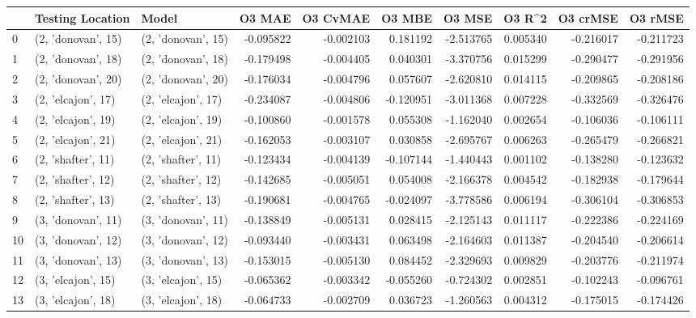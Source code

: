 \begin{tabular}{lllrrrrrrr}
\toprule
{} &    Testing Location &               Model &    O3 MAE &  O3 CvMAE &    O3 MBE &     O3 MSE &    O3 R\textasciicircum2 &  O3 crMSE &   O3 rMSE \\
\midrule
0  &  (2, 'donovan', 15) &  (2, 'donovan', 15) & -0.095822 & -0.002103 &  0.181192 &  -2.513765 &  0.005340 & -0.216017 & -0.211723 \\
1  &  (2, 'donovan', 18) &  (2, 'donovan', 18) & -0.179498 & -0.004405 &  0.040301 &  -3.370756 &  0.015299 & -0.290477 & -0.291956 \\
2  &  (2, 'donovan', 20) &  (2, 'donovan', 20) & -0.176034 & -0.004796 &  0.057607 &  -2.620810 &  0.014115 & -0.209865 & -0.208186 \\
3  &  (2, 'elcajon', 17) &  (2, 'elcajon', 17) & -0.234087 & -0.004806 & -0.120951 &  -3.011368 &  0.007228 & -0.332569 & -0.326476 \\
4  &  (2, 'elcajon', 19) &  (2, 'elcajon', 19) & -0.100860 & -0.001578 &  0.055308 &  -1.162040 &  0.002654 & -0.106036 & -0.106111 \\
5  &  (2, 'elcajon', 21) &  (2, 'elcajon', 21) & -0.162053 & -0.003107 &  0.030858 &  -2.695767 &  0.006263 & -0.265479 & -0.266821 \\
6  &  (2, 'shafter', 11) &  (2, 'shafter', 11) & -0.123434 & -0.004139 & -0.107144 &  -1.440443 &  0.001102 & -0.138280 & -0.123632 \\
7  &  (2, 'shafter', 12) &  (2, 'shafter', 12) & -0.142685 & -0.005051 &  0.054008 &  -2.166378 &  0.004542 & -0.182938 & -0.179644 \\
8  &  (2, 'shafter', 13) &  (2, 'shafter', 13) & -0.190681 & -0.004765 & -0.024097 &  -3.778586 &  0.006194 & -0.306104 & -0.306853 \\
9  &  (3, 'donovan', 11) &  (3, 'donovan', 11) & -0.138849 & -0.005131 &  0.028415 &  -2.125143 &  0.011117 & -0.222386 & -0.224169 \\
10 &  (3, 'donovan', 12) &  (3, 'donovan', 12) & -0.093440 & -0.003431 &  0.063498 &  -2.164603 &  0.011387 & -0.204540 & -0.206614 \\
11 &  (3, 'donovan', 13) &  (3, 'donovan', 13) & -0.153015 & -0.005130 &  0.084452 &  -2.329693 &  0.009829 & -0.203776 & -0.211974 \\
12 &  (3, 'elcajon', 15) &  (3, 'elcajon', 15) & -0.065362 & -0.003342 & -0.055260 &  -0.724302 &  0.002851 & -0.102243 & -0.096761 \\
13 &  (3, 'elcajon', 18) &  (3, 'elcajon', 18) & -0.064733 & -0.002709 &  0.036723 &  -1.260563 &  0.004312 & -0.175015 & -0.174426 \\

\end{tabular}
